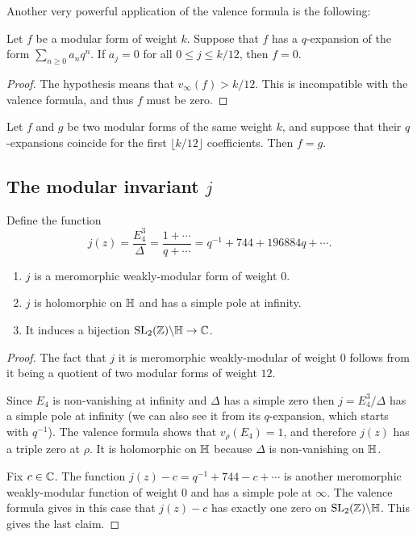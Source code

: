 Another very powerful application of the valence formula is the following:
\begin{theorem}
  Let $f$ be a modular form of weight $k$. Suppose that $f$ has a $q$-expansion of the form $\sum_{n\geq 0} a_nq^n$. If $a_j=0$ for all $0\leq j\leq k/12$, then $f=0$.
\end{theorem}
\begin{proof}
  The hypothesis means that $v_\infty(f) > k/12$. This is incompatible with the valence formula, and thus $f$ must be zero.
\end{proof}
\begin{corollary}
  Let $f$ and $g$ be two modular forms of the same weight $k$, and suppose that their $q$-expansions coincide for the first $\lfloor k/12\rfloor$ coefficients. Then $f=g$.
\end{corollary}

\subsection{The modular invariant \texorpdfstring{$j$}{j}}
  Define the function
\[
j(z)=\frac{E_4^3}{\Delta} = \frac{1+\cdots}{q+\cdots} = q^{-1} + 744 + 196884 q + \cdots.
\]
\begin{proposition}
  \begin{enumerate}
  \item $j$ is a meromorphic weakly-modular form of weight $0$.
  \item $j$ is holomorphic on $\mathbb{H}$ and has a simple pole at infinity.
  \item It induces a bijection $\operatorname{SL}_2(\mathbb{Z})\backslash\mathbb{H}\to \mathbb{C}$.
  \end{enumerate}
\end{proposition}
\begin{proof}
The fact that $j$ it is meromorphic weakly-modular of weight $0$ follows from it being a quotient of two modular forms of weight $12$.

Since $E_4$ is non-vanishing at infinity and $\Delta$ has a simple zero then $j=E_4^3/\Delta$ has a simple pole at infinity (we can also see it from its $q$-expansion, which starts with $q^{-1}$). The valence formula shows that $v_\rho(E_4)=1$, and therefore $j(z)$ has a triple zero at $\rho$. It is holomorphic on $\mathbb{H}$ because $\Delta$ is non-vanishing on $\mathbb{H}$.

Fix $c\in\mathbb{C}$. The function $j(z)-c=q^{-1}+744-c+\cdots$ is another meromorphic weakly-modular function of weight $0$ and has a simple pole at $\infty$. The valence formula gives in this case that $j(z)-c$ has exactly one zero on $\operatorname{SL}_2(\mathbb{Z})\backslash\mathbb{H}$. This gives the last claim.
\end{proof}


